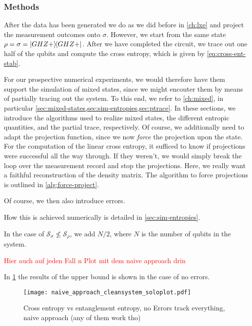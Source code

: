 \subsubsection{Methods}
After the data has been generated we do as we did before in \cref{ch:lxe} and
project the measurement outcomes onto $\sigma$. However, we start from the same
state $\rho = \sigma = \dyad{GHZ+}$. After we have completed the circuit, we
trace out one half of the qubits and compute the cross entropy, which is given
by \cref{eq:cross-ent-stab}. 

For our prospective numerical experiments, we would therefore have them support
the simulation of mixed states, since we might encouter them by means of
partially tracing out the system. To this end, we refer to \cref{ch:mixed}, in
particular \cref{sec:mixed-states,sec:sim-entropies,sec:ptrace}. In these
sections, we introduce the algorithms used to realize mixed states, the
different entropic quantities, and the partial trace, respectively. Of course,
we additionally need to adapt the projection function, since we now
\emph{force} the projection upon the state. For the computation of the linear
cross entropy, it sufficed to know if projections were successful all the way
through. If they weren't, we would simply break the loop over the measurement
record and stop the projections. Here, we really want a faithful reconstruction
of the density matrix. The algorithm to force projections is outlined in
\cref{alg:force-project}.

Of course, we then also introduce errors. 

How this is achieved numerically is detailed in
\cref{sec:sim-entropies}. 

In the case of $\mathcal{S}_\sigma \not\leq
\mathcal{S}_\rho$, we add $N /2$, where $N$ is the number of qubits in the
system. 

\textcolor{red}{Hier auch auf jeden Fall n Plot mit dem naive approach drin}

In \cref{fig:naive-svn-vs-se-no-error} the results of the upper bound is shown
in the case of no errors.
\begin{figure}[H]
  \centering
  \texttt{[image: naive\_approach\_cleansystem\_soloplot.pdf]}
  \caption{Cross entropy vs entanglement entropy, no Errors track everything, naive approach (any of them work tho)}
  \label{fig:naive-svn-vs-se-no-error}
\end{figure}

